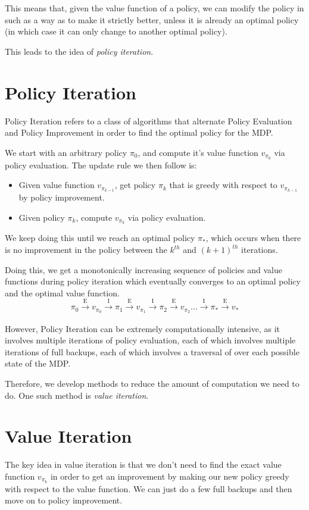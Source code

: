 \documentclass[12pt]{report}
\begin{document}
This means that, given the value function of a policy, we can modify the policy in such as a way as to make it strictly better, unless it is already an optimal policy (in which case it can only change to another optimal policy).

This leads to the idea of \textit{policy iteration}.
\section{Policy Iteration}
Policy Iteration refers to a class of algorithms that alternate Policy Evaluation and Policy Improvement in order to find the optimal policy for the MDP.

We start with an arbitrary policy $\pi_{0}$, and compute it's value function $v_{\pi_{0}}$ via policy evaluation. The update rule we then follow is:
\begin{itemize}
    \item Given value function $v_{\pi_{k - 1}}$, get policy $\pi_{k}$ that is greedy with respect to $v_{\pi_{k - 1}}$ by policy improvement.
    \item Given policy $\pi_{k}$, compute $v_{\pi_{k}}$ via policy evaluation.
\end{itemize}
We keep doing this until we reach an optimal policy $\pi_{*}$, which occurs when there is no improvement in the policy between the $k^{th}$ and $(k + 1)^{th}$ iterations.

Doing this, we get a monotonically increasing sequence of policies and value functions during policy iteration which eventually converges to an optimal policy and the optimal value function.
\begin{equation*}
    \pi_{0} \xrightarrow[]{\text{E}} v_{\pi_{0}} \xrightarrow[]{\text{I}} \pi_{1} \xrightarrow[]{\text{E}} v_{\pi_{1}} \xrightarrow[]{\text{I}} \pi_{2} \xrightarrow[]{\text{E}} v_{\pi_{2}} \dots \xrightarrow[]{\text{I}} \pi_{*} \xrightarrow[]{\text{E}} v_{*}
\end{equation*}

However, Policy Iteration can be extremely computationally intensive, as it involves multiple iterations of policy evaluation, each of which involves multiple iterations of full backups, each of which involves a traversal of over each possible state of the MDP. 

Therefore, we develop methods to reduce the amount of computation we need to do. One such method is \textit{value iteration}.

\section{Value Iteration}
The key idea in value iteration is that we don't need to find the exact value function $v_{\pi_{k}}$ in order to get an improvement by making our new policy greedy with respect to the value function. We can just do a few full backups and then move on to policy improvement.
\end{document}
